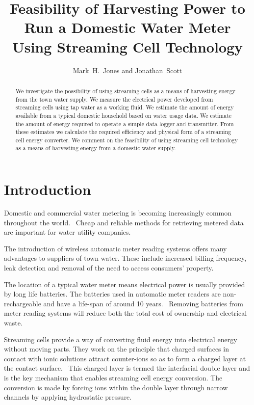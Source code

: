 \documentclass[10pt,final,journal]{IEEEtran}
\title{Feasibility of Harvesting Power to Run a Domestic Water Meter Using Streaming Cell Technology}
\author{Mark~H.~Jones and Jonathan~Scott}
\begin{document}
    \maketitle

    \begin{abstract}
        We investigate the possibility of using streaming cells as a means of harvesting energy from the town water supply.
        We measure the electrical power developed from streaming cells using tap water as a working fluid.
        We estimate the amount of energy available from a typical domestic household based on water usage data.
        We estimate the amount of energy required to operate a simple data logger and transmitter.
        From these estimates we calculate the required efficiency and physical form of a streaming cell energy converter.
        We comment on the feasibility of using streaming cell technology as a means of harvesting energy from a domestic water supply.
    \end{abstract}

    \section{Introduction}
        \label{sect:Introduction}
        Domestic and commercial water metering is becoming increasingly common throughout the world.~\cite{Chang2012}
        Cheap and reliable methods for retrieving metered data are important for water utility companies.

        The introduction of wireless automatic meter reading systems offers many advantages to suppliers of town water.
        These include increased billing frequency, leak detection and removal of the need to access consumers' property.~\cite{Chang2012,Britton2013}

        The location of a typical water meter means electrical power is usually provided by long life batteries.
        The batteries used in automatic meter readers are non-rechargeable and have a life-span of around 10 years.~\cite{BMeters2014}
        Removing batteries from meter reading systems will reduce both the total cost of ownership and electrical waste.

        Streaming cells provide a way of converting fluid energy into electrical energy without moving parts.
        They work on the principle that charged surfaces in contact with ionic solutions attract counter-ions so as to form a charged layer at the contact surface.~\cite{Stein2004}
        This charged layer is termed the interfacial double layer and is the key mechanism that enables streaming cell energy conversion.
        The conversion is made by forcing ions within the double layer through narrow channels by applying hydrostatic pressure.
\end{document}
